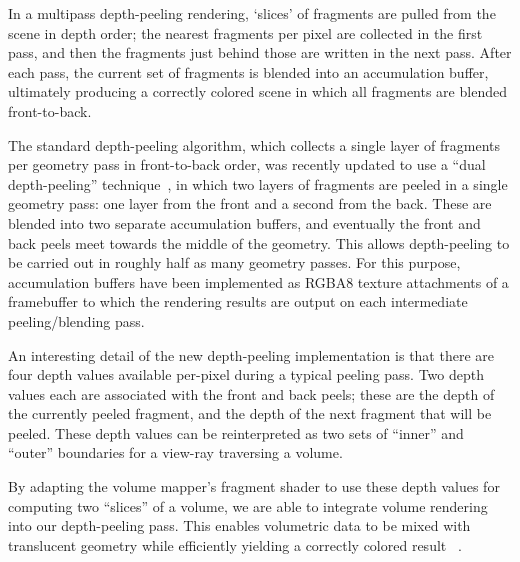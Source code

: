 In a multipass depth-peeling rendering, `slices' of fragments are pulled from
the scene in depth order; the nearest fragments per pixel are collected in
the first pass, and then the fragments just behind those are written in the next
pass. After each pass, the current set of fragments is blended into an
accumulation buffer, ultimately producing a correctly colored scene in which all
fragments are blended front-to-back.

The standard depth-peeling algorithm, which collects a single layer of fragments
per geometry pass in front-to-back order, was recently updated to use a ``dual
depth-peeling'' technique~\citep{bavoil_order_2008}, in which two layers of
fragments are peeled in a single geometry pass: one layer from the front and a
second from the back. These are blended into two separate accumulation buffers,
and eventually the front and back peels meet towards the middle of the
geometry. This allows depth-peeling to be carried out in roughly half as many
geometry passes.  For this purpose, accumulation buffers have been implemented
as RGBA8 texture attachments of a framebuffer to which the rendering results
are output on each intermediate peeling/blending pass.

An interesting detail of the new depth-peeling implementation is that there are
four depth values available per-pixel during a typical peeling pass. Two depth
values each are associated with the front and back peels; these are the depth of
the currently peeled fragment, and the depth of the next fragment that will be
peeled. These depth values can be reinterpreted as two sets of ``inner'' and
``outer'' boundaries for a view-ray traversing a volume.

By adapting the volume mapper's fragment shader to use these depth values for
computing two ``slices'' of a volume, we are able to integrate volume rendering
into our depth-peeling pass. This enables volumetric data to be mixed with
translucent geometry while efficiently yielding a correctly colored result
~.

